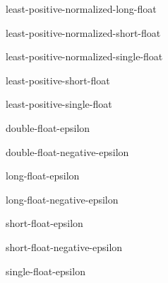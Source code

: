 \documentclass[10pt,english]{book}
\begin{document}
\begin{constant}{least-positive-normalized-long-float}{}
  
\end{constant}

\begin{constant}{least-positive-normalized-short-float}{}
  
\end{constant}

\begin{constant}{least-positive-normalized-single-float}{}
  
\end{constant}

\begin{constant}{least-positive-short-float}{}
  
\end{constant}

\begin{constant}{least-positive-single-float}{}
  
\end{constant}

\begin{constant}{double-float-epsilon}{}
  
\end{constant}

\begin{constant}{double-float-negative-epsilon}{}
  
\end{constant}

\begin{constant}{long-float-epsilon}{}
  
\end{constant}

\begin{constant}{long-float-negative-epsilon}{}
  
\end{constant}

\begin{constant}{short-float-epsilon}{}
  
\end{constant}

\begin{constant}{short-float-negative-epsilon}{}
  
\end{constant}

\begin{constant}{single-float-epsilon}{}
  
\end{constant}
\end{document}
